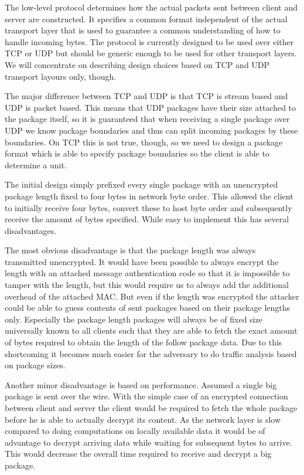The low-level protocol determines how the actual packets sent between client and server are constructed.
It specifies a common format independent of the actual transport layer that is used to guarantee a common understanding of how to handle incoming bytes.
The protocol is currently designed to be used over either TCP or UDP but should be generic enough to be used for other transport layers.
We will concentrate on describing design choices based on TCP and UDP transport layours only, though.

The major difference between TCP and UDP is that TCP is stream based and UDP is packet based.
This means that UDP packages have their size attached to the package itself, so it is guaranteed that when receiving a single package over UDP we know package boundaries and thus can split incoming packages by these boundaries.
On TCP this is not true, though, so we need to design a package format which is able to specify package boundaries so the client is able to determine a unit.

The initial design simply prefixed every single package with an unencrypted package length fixed to four bytes in network byte order.
This allowed the client to initially receive four bytes, convert these to host byte order and subsequently receive the amount of bytes specified.
While easy to implement this has several disadvantages.

The most obvious disadvantage is that the package length was always transmitted unencrypted.
It would have been possible to always encrypt the length with an attached message authentication code so that it is impossible to tamper with the length, but this would require us to always add the additional overhead of the attached MAC.
But even if the length was encrypted the attacker could be able to guess contents of sent packages based on their package lengths only.
Especially the package length packages will always be of fixed size universally known to all clients such that they are able to fetch the exact amount of bytes required to obtain the length of the follow package data.
Due to this shortcoming it becomes much easier for the adversary to do traffic analysis based on package sizes.

Another minor disadvantage is based on performance.
Assumed a single big package is sent over the wire.
With the simple case of an encrypted connection between client and server the client would be required to fetch the whole package before he is able to actually decrypt its content.
As the network layer is slow compared to doing computations on locally available data it would be of advantage to decrypt arriving data while waiting for subsequent bytes to arrive.
This would decrease the overall time required to receive and decrypt a big package.


